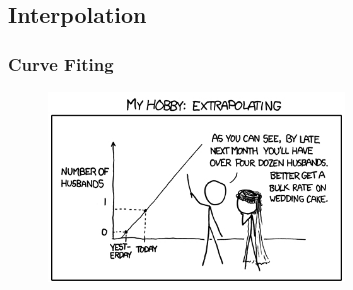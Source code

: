\documentclass[10pt,colorlinks]{beamer}
\begin{document}
\subsection{Interpolation}

\begin{frame}[fragile]\frametitle{Curve Fiting}
\begin{figure}[!htb]
    \centering
    \includegraphics[width=0.7\textwidth]{figs/extrapolation}
\end{figure}
\end{frame}
\end{document}
